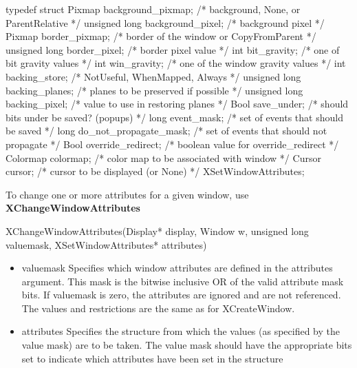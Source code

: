 \documentclass{report}
\begin{document}
\begin{itemize}
\begin{cppcode}
                typedef struct {
                    Pixmap background_pixmap;       /* background, None, or ParentRelative */
                    unsigned long background_pixel; /* background pixel */
                    Pixmap border_pixmap;           /* border of the window or CopyFromParent */
                    unsigned long border_pixel;     /* border pixel value */
                    int bit_gravity;                /* one of bit gravity values */
                    int win_gravity;                /* one of the window gravity values */
                    int backing_store;              /* NotUseful, WhenMapped, Always */
                    unsigned long backing_planes;   /* planes to be preserved if possible */
                    unsigned long backing_pixel;    /* value to use in restoring planes */
                    Bool save_under;                /* should bits under be saved? (popups) */
                    long event_mask;                /* set of events that should be saved */
                    long do_not_propagate_mask;     /* set of events that should not propagate */
                    Bool override_redirect;         /* boolean value for override_redirect */
                    Colormap colormap;              /* color map to be associated with window */
                    Cursor cursor;                  /* cursor to be displayed (or None) */
                } XSetWindowAttributes;
            \end{cppcode}
            \bigbreak \noindent 
            To change one or more attributes for a given window, use \textbf{XChangeWindowAttributes}
            \bigbreak \noindent 
            \begin{cppcode}
                XChangeWindowAttributes(Display* display, Window w, unsigned long valuemask, XSetWindowAttributes* attributes)
            \end{cppcode}
            \bigbreak \noindent
            \begin{itemize}
                \item valuemask Specifies which window attributes are defined in the attributes argument. This mask is the bitwise inclusive OR of the valid attribute mask bits. If valuemask is zero, the attributes are ignored and are not referenced. The values and restrictions are the same as for XCreateWindow.
                \item attributes Specifies the structure from which the values (as specified by the value mask) are to be taken. The value mask should have the appropriate bits set to indicate which attributes have been set in the structure

\end{itemize}
\end{itemize}
\end{document}
